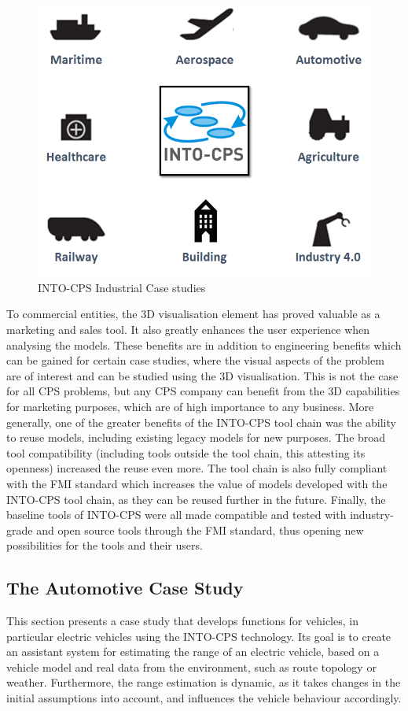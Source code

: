 \begin{figure}[!ht]
	\centering
		\includegraphics[width=0.5 \textwidth]{./figures/industrial}
	\caption{INTO-CPS Industrial Case studies}
	\label{fig:industrial}
\end{figure}

To commercial entities, the 3D visualisation element has proved valuable as a marketing and sales tool. It also greatly enhances the user experience when analysing the models. These benefits are in addition to engineering benefits which can be gained for certain case studies, where the visual aspects of the problem are of interest and can be studied using the 3D visualisation. This is not the case for all CPS problems, but any CPS company can benefit from the 3D capabilities for marketing purposes, which are of high importance to any business. More generally, one of the greater benefits of the INTO-CPS tool chain was the ability to reuse models, including existing legacy models for new purposes. The broad tool compatibility (including tools outside the tool chain, this attesting its openness) increased the reuse even more. The tool chain is also fully compliant with the FMI standard which increases the value of models developed with the INTO-CPS tool chain, as they can be reused further in the future. Finally, the baseline tools of INTO-CPS were all made compatible and tested with industry-grade and open source tools through the FMI standard, thus opening new possibilities for the tools and their users.

\subsection{The Automotive Case Study}

This section presents a case study that develops functions for vehicles, in particular electric vehicles using the INTO-CPS technology. Its goal is to create an assistant system for estimating the range of an electric vehicle, based on a vehicle model and real data from the environment, such as route topology or weather. Furthermore, the range estimation is dynamic, as it takes changes in the initial assumptions into account, and influences the vehicle behaviour accordingly.

